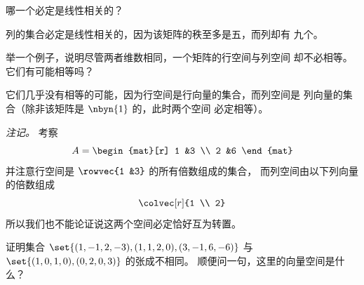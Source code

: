     哪一个必定是线性相关的？
    \begin{answer}
      列的集合必定是线性相关的，因为该矩阵的秩至多是五，而列却有
      九个。
    \end{answer}
  \item
    举一个例子，说明尽管两者维数相同，一个矩阵的行空间与列空间
    却不必相等。
    它们有可能相等吗？
    \begin{answer}
      它们几乎没有相等的可能，因为行空间是行向量的集合，而列空间是
      列向量的集合（除非该矩阵是 \( \nbyn{1} \) 的，此时两个空间
      必定相等）。

      \textit{注记。}
      考察
      \begin{equation*}
        A=\begin{mat}[r]
            1  &3  \\
            2  &6
          \end{mat}
      \end{equation*}
      并注意行空间是 \( \rowvec{1 &3} \) 的所有倍数组成的集合，
      而列空间由以下列向量的倍数组成
      \begin{equation*}
        \colvec[r]{1 \\ 2}
      \end{equation*}
      所以我们也不能论证说这两个空间必定恰好互为转置。
    \end{answer}
  \item
    证明集合
    \( \set{(1,-1,2,-3),(1,1,2,0),(3,-1,6,-6)} \) 与
    \( \set{(1,0,1,0),(0,2,0,3)} \) 的张成不相同。
    顺便问一句，这里的向量空间是什么？
